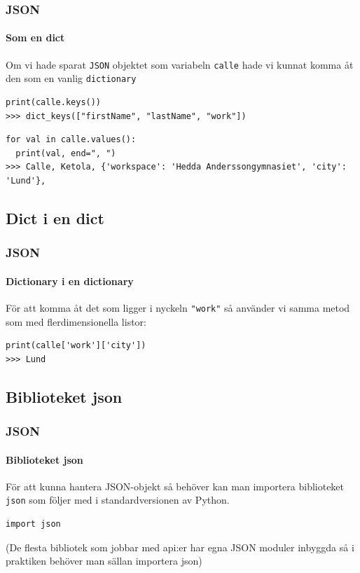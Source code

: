 \documentclass[aspectratio=169]{beamer}
\begin{document}
\begin{frame}[fragile]
\frametitle{JSON}
\framesubtitle{Som en dict}

Om vi hade sparat \texttt{JSON} objektet som variabeln \texttt{calle} hade vi kunnat komma åt den som en vanlig \texttt{dictionary}

\begin{lstlisting}
print(calle.keys())
>>> dict_keys(["firstName", "lastName", "work"])
\end{lstlisting}

\begin{lstlisting}
for val in calle.values():
  print(val, end=", ")
>>> Calle, Ketola, {'workspace': 'Hedda Anderssongymnasiet', 'city': 'Lund'},
\end{lstlisting}

\end{frame}

\subsection{Dict i en dict}

\begin{frame}[fragile]
\frametitle{JSON}
\framesubtitle{Dictionary i en dictionary}

För att komma åt det som ligger i nyckeln \lstinline{"work"} så använder vi samma metod som med flerdimensionella listor:

\begin{lstlisting}
print(calle['work']['city'])
>>> Lund
\end{lstlisting}

\end{frame}

\subsection{Biblioteket json}

\begin{frame}[fragile]
\frametitle{JSON}
\framesubtitle{Biblioteket json}

För att kunna hantera JSON-objekt så behöver kan man importera biblioteket \texttt{json} som följer med i standardversionen av Python.

\begin{lstlisting}
import json
\end{lstlisting}

(De flesta bibliotek som jobbar med api:er har egna JSON moduler inbyggda så i praktiken behöver man sällan importera json)

\end{frame}
\end{document}
